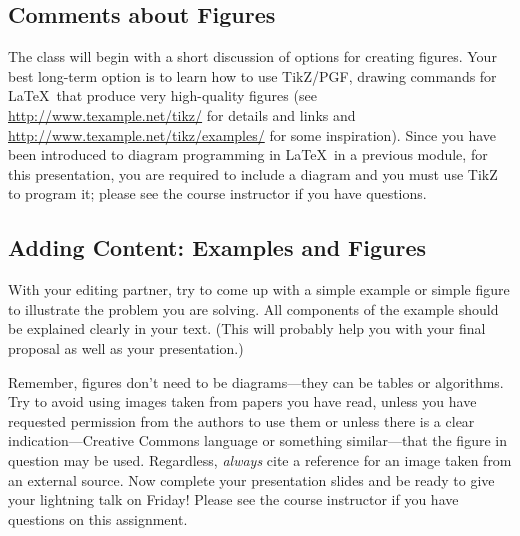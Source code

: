 \subsection*{Comments about Figures}

The class will begin with a short discussion of options for creating figures. Your best long-term option is to learn how
to use TikZ/PGF, drawing commands for \LaTeX\ that produce very high-quality figures (see
  \url{http://www.texample.net/tikz/} for details and links and \url{http://www.texample.net/tikz/examples/}
  for some inspiration). Since you have been introduced to diagram programming in \LaTeX\ in a previous module, for this
  presentation, you are required to include a diagram and you must use TikZ to program it; please see the course
  instructor if you have questions.

\subsection*{Adding Content: Examples and Figures}

With your editing partner, try to come up with a simple example or simple figure to illustrate the problem you are
solving. All components of the example should be explained clearly in your text.  (This will probably help you with your
final proposal as well as your presentation.)

Remember, figures don't need to be diagrams---they can be tables or algorithms. Try to avoid using images taken from
papers you have read, unless you have requested permission from the authors to use them or unless there is a clear
indication---Creative Commons language or something similar---that the figure in question may be used. Regardless, {\em
always} cite a reference for an image taken from an external source.  Now complete your presentation slides and be ready
to give your lightning talk on Friday! Please see the course instructor if you have questions on this assignment.






